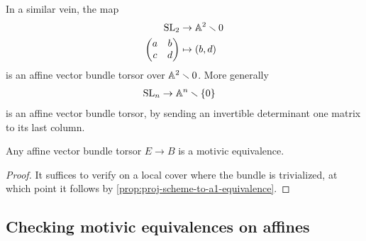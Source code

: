 \documentclass[11pt]{amsart}
\begin{document}
\begin{example} In a similar vein, the map
\begin{align*}
    \mathrm{SL}_2 &\to \mathbb{A}^2\smallsetminus 0 \\
    \begin{pmatrix} a & b \\ c & d \end{pmatrix} &\mapsto (b,d)
\end{align*}
is an affine vector bundle torsor over $\mathbb{A}^2\smallsetminus 0$. More generally
\begin{align*}
    \mathrm{SL}_n &\to \mathbb{A}^n\smallsetminus\{0\}
\end{align*}
is an affine vector bundle torsor, by sending an invertible determinant one matrix to its last column.
\end{example}

\begin{proposition} Any affine vector bundle torsor $E \to B$ is a motivic equivalence.
\end{proposition}
\begin{proof} It suffices to verify on a local cover where the bundle is trivialized, at which point it follows by \autoref{prop:proj-scheme-to-a1-equivalence}.
\end{proof}

\subsection{Checking motivic equivalences on affines}
\end{document}

